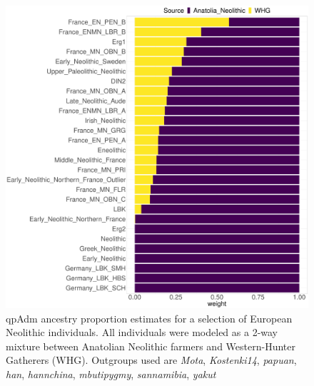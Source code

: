 \begin{figure}[htp]
    \centering
    \includegraphics[width=1.0\textwidth]{../images/chapter4/HG_ancestry_Neolithic.pdf}
    \caption{qpAdm ancestry proportion estimates for a selection of European Neolithic individuals. All individuals were modeled as a 2-way mixture between Anatolian Neolithic farmers and Western-Hunter Gatherers (WHG). Outgroups used are \textit{Mota}, \textit{Kostenki14}, \textit{papuan}, \textit{han}, \textit{hannchina}, \textit{mbutipygmy}, \textit{sannamibia}, \textit{yakut}}
    \label{fig:HG_ancestry_Neolithic}
\end{figure}



